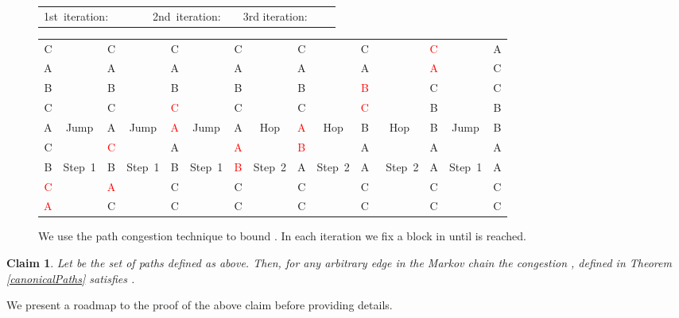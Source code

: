 \documentclass[10 pt]{article}
\newtheorem{claim}[thm]{Claim}
\begin{document}
\begin{figure}[h]
\noindent
\begin{tiny}


\begin{tabular}{ccccccccr}
\mbox{1st iteration:} &\quad&\quad&\quad\quad\quad\quad\quad\quad\quad\quad\quad\quad\quad\quad\quad\quad\quad\quad\quad&\mbox{2nd iteration:}&\quad&3rd iteration:\\
\end{tabular}

\hspace*{-0.3cm}
\begin{tabular}{rcccccccccccccc}
C&&C&& C&&C&&C&&C&&\textcolor{red}{C}&&A\\
A& &A&& A&&A&&A&&{A}&&\textcolor{red}{A}&&C\\
B&&B& &B&&B&&B&&\textcolor{red}{B}&&{C}&&C\\
C&&C&&\textcolor{red}{ C}&&C&&C&&\textcolor{red}{C}&&B&&B\\
A&\mbox{\tiny Jump}&A&\mbox{\tiny Jump}&\textcolor{red}{ A}&\mbox{\tiny Jump}&A&\mbox{\tiny Hop}&\textcolor{red}{A}&\mbox{\tiny Hop}&B&\mbox{\tiny Hop}&B&\mbox{\tiny Jump}&B\\
{C}&&\textcolor{red}{C}&& A&&\textcolor{red}{A}&&\textcolor{red}{B}&&A&&A&&A\\
B&\mbox{\tiny Step 1}&B&\mbox{\tiny Step 1}& B&\mbox{\tiny Step 1}&\textcolor{red}{B}&\mbox{\tiny Step 2}&A&\mbox{\tiny Step 2}&A&\mbox{ \tiny Step 2}&A&\mbox{\tiny Step 1}&A\\
\textcolor{red}{C}&& \textcolor{red}{A}&&C&&C&&C&&C&&C&&C\\
\textcolor{red}{A}&& C&&C &&C&&C&&C&&C&&C 

\end{tabular}
\caption{We use the path congestion technique to bound . In each iteration we fix a block in  until  is reached.}
\end{tiny}
\end{figure}







\begin{claim}\label{PathClaim}
 Let  be the set of paths defined as above. Then, for any arbitrary edge  in
the Markov chain  the congestion , defined in Theorem \ref{canonicalPaths} satisfies .

\end{claim}

We present a roadmap to the proof of the above claim before providing details.
\smallskip
\end{document}
